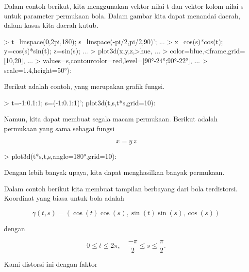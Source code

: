 \documentclass{report}
\begin{document}
\begin{eulernotebook}
\begin{eulercomment}
\begin{eulercomment}
\begin{eulercomment}
Dalam contoh berikut, kita menggunakan vektor nilai t dan vektor kolom
nilai s untuk parameter permukaan bola. Dalam gambar kita dapat
menandai daerah, dalam kasus kita daerah kutub.
\end{eulercomment}
\begin{eulerprompt}
> t=linspace(0,2pi,180); s=linspace(-pi/2,pi/2,90)'; ...
> x=cos(s)*cos(t); y=cos(s)*sin(t); z=sin(s); ...
> plot3d(x,y,z,>hue, ...
> color=blue,<frame,grid=[10,20], ...
> values=s,contourcolor=red,level=[90°-24°;90°-22°], ...
> scale=1.4,height=50°):
\end{eulerprompt}
\begin{eulercomment}
Berikut adalah contoh, yang merupakan grafik fungsi.
\end{eulercomment}
\begin{eulerprompt}
> t=-1:0.1:1; s=(-1:0.1:1)'; plot3d(t,s,t*s,grid=10):
\end{eulerprompt}
\begin{eulercomment}
Namun, kita dapat membuat segala macam permukaan. Berikut adalah
permukaan yang sama sebagai fungsi

\end{eulercomment}
\begin{eulerformula}
\[
x = y \, z
\]
\end{eulerformula}
\begin{eulerprompt}
> plot3d(t*s,t,s,angle=180°,grid=10):
\end{eulerprompt}
\begin{eulercomment}
Dengan lebih banyak upaya, kita dapat menghasilkan banyak permukaan.

Dalam contoh berikut kita membuat tampilan berbayang dari bola
terdistorsi. Koordinat yang biasa untuk bola adalah

\end{eulercomment}
\begin{eulerformula}
\[
\gamma(t,s) = (\cos(t)\cos(s),\sin(t)\sin(s),\cos(s))
\]
\end{eulerformula}
\begin{eulercomment}
dengan

\end{eulercomment}
\begin{eulerformula}
\[
0 \le t \le 2\pi, \quad \frac{-\pi}{2} \le s \le \frac{\pi}{2}.
\]
\end{eulerformula}
\begin{eulercomment}
Kami distorsi ini dengan faktor


\end{eulercomment}
\end{eulercomment}
\end{eulercomment}
\end{eulernotebook}
\end{document}
